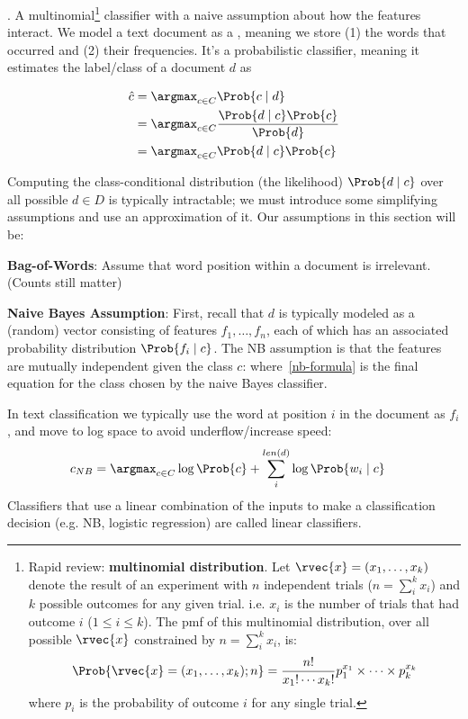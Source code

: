 \documentclass[11pt]{article}
\newcommand\myspace[1][]{\vspace{#1\bigskipamount}}
\newcommand\p{\Needspace{10\baselineskip} \noindent}
\begin{document}
\myspace
\p {}. A multinomial\footnote{
	
	Rapid review: \textbf{multinomial distribution}. Let $\rvec{x} = (x_1, \ldots, x_k)$ denote the result of an experiment with $n$ independent trials ($n = \sum_i^k x_i$) and $k$ possible outcomes for any given trial. i.e. $x_i$ is the number of trials that had outcome $i$ ($1 \le i \le k$). The pmf of this multinomial distribution, over all possible $\rvec{x}$ constrained by $n = \sum_i^k x_i$, is:
	\begin{align}
		\Prob{ \rvec{x} = (x_1, \ldots, x_k); n } = \frac{n!}{x_1! \cdots x_k!} p_1^{x_1} \times \cdots \times p_k^{x_k}
	\end{align}
	where $p_i$ is the probability of outcome $i$ for any single trial.
	
} classifier with a naive assumption about how the features interact. We model a text document as a , meaning we store (1) the words that occurred and (2) their frequencies. It's a probabilistic classifier, meaning it estimates the label/class of a document $d$ as 

\begin{align}
	\hat c &= \argmax_{c \in C} \Prob{c \mid d}  \\
		&= \argmax_{c \in C} \frac{ \Prob{d \mid c} \Prob{c} }{ \Prob{d} } \\
		&= \argmax_{c \in C} \Prob{d \mid c} \Prob{c}
\end{align}

Computing the class-conditional distribution (the likelihood) $\Prob{d \mid c}$ over all possible $d \in D$ is typically intractable; we must introduce some simplifying assumptions and use an approximation of it. Our assumptions in this section will be:
\begin{compactitem}
	\item \textbf{Bag-of-Words}: Assume that word position within a document is irrelevant. (Counts still matter)
	
	\item \textbf{Naive Bayes Assumption}: First, recall that $d$ is typically modeled as a (random) vector consisting of features $f_1, \ldots, f_n$, each of which has an associated probability distribution $\Prob{f_i \mid c}$. The NB assumption is that the features are mutually independent given the class $c$:
	where~\ref{nb-formula} is the final equation for the class chosen by the naive Bayes classifier.
\end{compactitem}
In text classification we typically use the word at position $i$ in the document as $f_i$, and move to log space to avoid underflow/increase speed:
\begin{align}
	c_{NB} &= \argmax_{c \in C} \log\Prob{c} + \sum_i^{len(d)}\log\Prob{w_i \mid c} 
\end{align}
Classifiers that use a linear combination of the inputs to make a classification decision (e.g. NB, logistic regression) are called linear classifiers.
\end{document}
